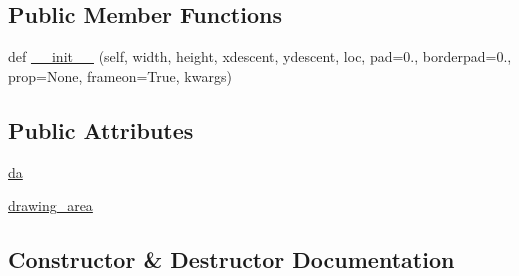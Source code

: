 \subsection*{Public Member Functions}
\begin{DoxyCompactItemize}
\item 
def \hyperlink{classaxes__grid1_1_1anchored__artists_1_1AnchoredDrawingArea_a6c46a4ba3f7a38fb6fdd269f239a623c}{\+\_\+\+\_\+init\+\_\+\+\_\+} (self, width, height, xdescent, ydescent, loc, pad=0., borderpad=0., prop=None, frameon=True, kwargs)
\end{DoxyCompactItemize}
\subsection*{Public Attributes}
\begin{DoxyCompactItemize}
\item 
\hyperlink{classaxes__grid1_1_1anchored__artists_1_1AnchoredDrawingArea_a4785fd434765666d9ee531b9c648907e}{da}
\item 
\hyperlink{classaxes__grid1_1_1anchored__artists_1_1AnchoredDrawingArea_a269387e8b219d2f5a0788e9276ac275a}{drawing\+\_\+area}
\end{DoxyCompactItemize}


\subsection{Constructor \& Destructor Documentation}
\mbox{\label{classaxes__grid1_1_1anchored__artists_1_1AnchoredDrawingArea_a6c46a4ba3f7a38fb6fdd269f239a623c}} 
